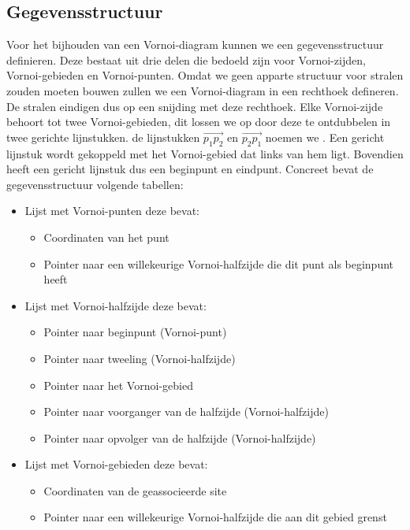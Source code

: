 \documentclass[a4paper,titlepage]{article}
\newcommand{\termen}[1]{\index{#1}\textbf{\sffamily{#1}}}
\newcommand{\lineparr}[1]{\overrightarrow{#1}}
\begin{document}
\subsection{Gegevensstructuur}
Voor het bijhouden van een Vornoi-diagram kunnen we een gegevensstructuur definieren. Deze bestaat uit drie delen die bedoeld zijn voor Vornoi-zijden, Vornoi-gebieden en Vornoi-punten. Omdat we geen apparte structuur voor stralen zouden moeten bouwen zullen we een Vornoi-diagram in een rechthoek defineren. De stralen eindigen dus op een snijding met deze rechthoek. Elke Vornoi-zijde behoort tot twee Vornoi-gebieden, dit lossen we op door deze te ontdubbelen in twee gerichte lijnstukken. de lijnstukken $\lineparr{p_1p_2}$ en $\lineparr{p_2p_1}$ noemen we \termen{tweelingen}. Een gericht lijnstuk wordt gekoppeld met het Vornoi-gebied dat links van hem ligt. Bovendien heeft een gericht lijnstuk dus een beginpunt en eindpunt. Concreet bevat de gegevensstructuur volgende tabellen:
\begin{itemize}
 \item Lijst met Vornoi-punten deze bevat:
 \begin{itemize}
  \item Coordinaten van het punt
  \item Pointer naar een willekeurige Vornoi-halfzijde die dit punt als beginpunt heeft
 \end{itemize}
\item Lijst met Vornoi-halfzijde deze bevat:
 \begin{itemize}
  \item Pointer naar beginpunt (Vornoi-punt)
  \item Pointer naar tweeling (Vornoi-halfzijde)
  \item Pointer naar het Vornoi-gebied
  \item Pointer naar voorganger van de halfzijde (Vornoi-halfzijde)
  \item Pointer naar opvolger van de halfzijde (Vornoi-halfzijde)
 \end{itemize}
\item Lijst met Vornoi-gebieden deze bevat:
 \begin{itemize}
  \item Coordinaten van de geassocieerde site
  \item Pointer naar een willekeurige Vornoi-halfzijde die aan dit gebied grenst
 \end{itemize}
\end{itemize}
\end{document}
